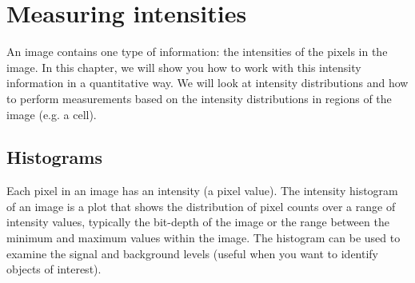 \chapter{Measuring intensities}
An image contains one type of information: the intensities of the pixels in the image. In this chapter, we will show you how to work with this intensity information in a quantitative way. We will look at intensity distributions and how to perform measurements based on the intensity distributions in regions of the image (e.g. a cell). 

\section{Histograms}
Each pixel in an image has an intensity (a pixel value). The intensity histogram of an image is a plot that shows the distribution of pixel counts over a range of intensity values, typically the bit-depth of the image or the range between the minimum and maximum values within the image. The histogram can be used to examine the signal and background levels (useful when you want to identify objects of interest).

